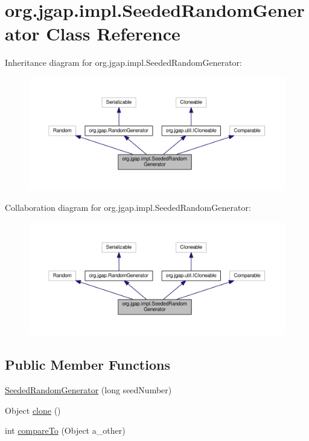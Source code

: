 \hypertarget{classorg_1_1jgap_1_1impl_1_1_seeded_random_generator}{\section{org.\-jgap.\-impl.\-Seeded\-Random\-Generator Class Reference}
\label{classorg_1_1jgap_1_1impl_1_1_seeded_random_generator}
}


Inheritance diagram for org.\-jgap.\-impl.\-Seeded\-Random\-Generator\-:
\nopagebreak
\begin{figure}[H]
\begin{center}
\leavevmode
\includegraphics[width=350pt]{classorg_1_1jgap_1_1impl_1_1_seeded_random_generator__inherit__graph}
\end{center}
\end{figure}


Collaboration diagram for org.\-jgap.\-impl.\-Seeded\-Random\-Generator\-:
\nopagebreak
\begin{figure}[H]
\begin{center}
\leavevmode
\includegraphics[width=350pt]{classorg_1_1jgap_1_1impl_1_1_seeded_random_generator__coll__graph}
\end{center}
\end{figure}
\subsection*{Public Member Functions}
\begin{DoxyCompactItemize}
\item 
\hyperlink{classorg_1_1jgap_1_1impl_1_1_seeded_random_generator_a2fc156657e1851259bbf2c9a9e3cd78b}{Seeded\-Random\-Generator} (long seed\-Number)
\item 
Object \hyperlink{classorg_1_1jgap_1_1impl_1_1_seeded_random_generator_ad0073ba484a430980d3dc638389dba10}{clone} ()
\item 
int \hyperlink{classorg_1_1jgap_1_1impl_1_1_seeded_random_generator_ac6b25a8c5bbc8a9707f76ac3189aa485}{compare\-To} (Object a\-\_\-other)
\end{DoxyCompactItemize}
